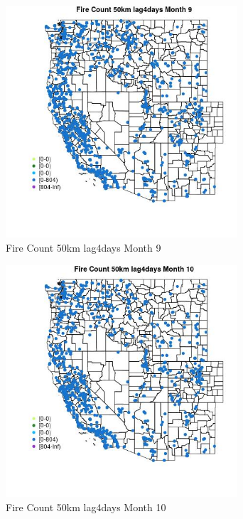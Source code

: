 \begin{figure} 
\centering  
\includegraphics[width=0.77\textwidth]{Code_Outputs/Report_ML_input_PM25_Step4_part_f_de_duplicated_aves_prioritize_24hr_obswNAs_MapObsMo9Fire_Count_50km_lag4days.jpg} 
\caption{\label{fig:Report_ML_input_PM25_Step4_part_f_de_duplicated_aves_prioritize_24hr_obswNAsMapObsMo9Fire_Count_50km_lag4days}Fire Count 50km lag4days Month 9} 
\end{figure} 
 

\begin{figure} 
\centering  
\includegraphics[width=0.77\textwidth]{Code_Outputs/Report_ML_input_PM25_Step4_part_f_de_duplicated_aves_prioritize_24hr_obswNAs_MapObsMo10Fire_Count_50km_lag4days.jpg} 
\caption{\label{fig:Report_ML_input_PM25_Step4_part_f_de_duplicated_aves_prioritize_24hr_obswNAsMapObsMo10Fire_Count_50km_lag4days}Fire Count 50km lag4days Month 10} 
\end{figure} 
 

